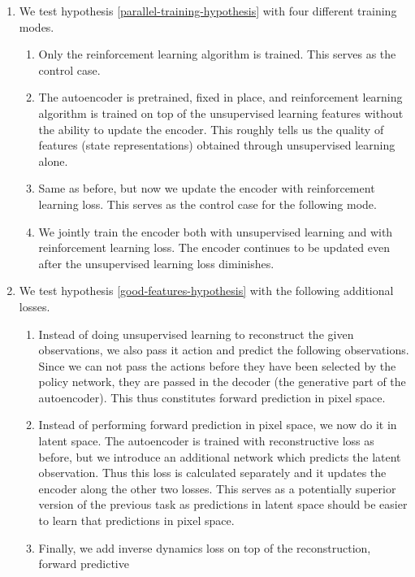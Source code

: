 \begin{enumerate}
		\item We test hypothesis \ref{parallel-training-hypothesis} with four different training modes.
		\begin{enumerate}
				\item Only the reinforcement learning algorithm is trained. This serves as 
						the control case.
				\item The autoencoder is pretrained, fixed in place, and reinforcement learning
						algorithm is trained on top of the unsupervised learning features
						without the ability to update the encoder. 
						This roughly tells us the quality of features (state representations) 
						obtained through unsupervised learning alone. \label{test-ae-fixed}
				\item Same as before, but now we update the encoder with reinforcement learning loss.
						This serves as the control case for the following mode.
				\item We jointly train the encoder both with unsupervised learning and with
						reinforcement learning loss. The encoder continues to be updated
						even after the unsupervised learning loss diminishes.
		\end{enumerate}
\item We test hypothesis \ref{good-features-hypothesis} with the following additional losses.
		\begin{enumerate}
				\item Instead of doing unsupervised learning to reconstruct the given observations,
						we also pass it action and predict the following observations.
						Since we can not pass the actions before they have been selected by the policy network,
						they are passed in the decoder (the generative part of the autoencoder).
						This thus constitutes forward prediction in pixel space.
				\item Instead of performing forward prediction in pixel space, we now do it in latent space.
						The autoencoder is trained with reconstructive loss as before, but we introduce
						an additional network which predicts the latent observation. Thus this loss is calculated
						separately and it updates the encoder along the other two losses.
						This serves as a potentially superior version of the previous task as predictions
						in latent space should be easier to learn that predictions in pixel space.
				\item Finally, we add inverse dynamics loss on top of the reconstruction, forward predictive 

\end{enumerate}
\end{enumerate}
